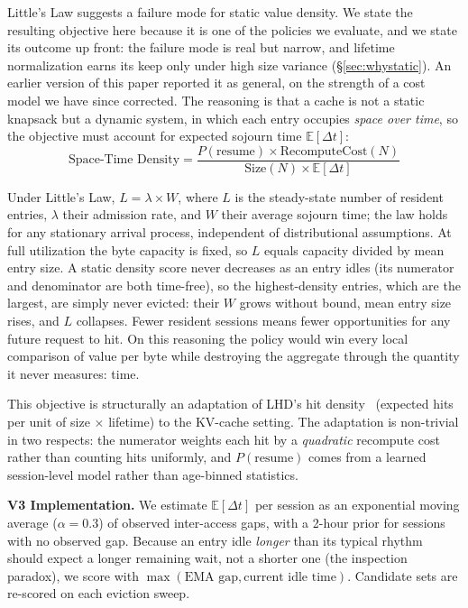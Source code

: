 \documentclass[letterpaper,twocolumn,10pt]{article}
\begin{document}
Little's Law suggests a failure mode for static value density. We state the resulting objective here because it is one of the policies we evaluate, and we state its outcome up front: the failure mode is real but narrow, and lifetime normalization earns its keep only under high size variance (\S\ref{sec:whystatic}). An earlier version of this paper reported it as general, on the strength of a cost model we have since corrected. The reasoning is that a cache is not a static knapsack but a dynamic system, in which each entry occupies \emph{space over time}, so the objective must account for expected sojourn time $\mathbb{E}[\Delta t]$:
\begin{equation}
  \text{Space-Time Density} = \frac{P(\text{resume}) \times \text{RecomputeCost}(N)}{\text{Size}(N) \times \mathbb{E}[\Delta t]}
  \label{eq:std_eq}
\end{equation}

Under Little's Law, $L = \lambda \times W$, where $L$ is the steady-state number of resident entries, $\lambda$ their admission rate, and $W$ their average sojourn time; the law holds for any stationary arrival process, independent of distributional assumptions. At full utilization the byte capacity is fixed, so $L$ equals capacity divided by mean entry size. A static density score never decreases as an entry idles (its numerator and denominator are both time-free), so the highest-density entries, which are the largest, are simply never evicted: their $W$ grows without bound, mean entry size rises, and $L$ collapses. Fewer resident sessions means fewer opportunities for any future request to hit. On this reasoning the policy would win every local comparison of value per byte while destroying the aggregate through the quantity it never measures: time.

This objective is structurally an adaptation of LHD's hit density~\cite{beckmann2018lhd} (expected hits per unit of size $\times$ lifetime) to the KV-cache setting. The adaptation is non-trivial in two respects: the numerator weights each hit by a \emph{quadratic} recompute cost rather than counting hits uniformly, and $P(\text{resume})$ comes from a learned session-level model rather than age-binned statistics.

\textbf{V3 Implementation.} We estimate $\mathbb{E}[\Delta t]$ per session as an exponential moving average ($\alpha{=}0.3$) of observed inter-access gaps, with a 2-hour prior for sessions with no observed gap. Because an entry idle \emph{longer} than its typical rhythm should expect a longer remaining wait, not a shorter one (the inspection paradox), we score with $\max(\text{EMA gap}, \text{current idle time})$. Candidate sets are re-scored on each eviction sweep.
\end{document}
